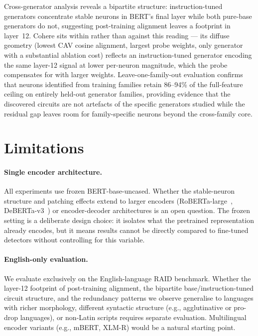 \documentclass[11pt]{article}
\newcommand{\bertbase}{BERT-base-uncased\xspace}
\begin{document}
Cross-generator analysis reveals a bipartite structure: instruction-tuned generators concentrate stable neurons in BERT's final layer while both pure-base generators do not, suggesting post-training alignment leaves a footprint in layer~12. Cohere sits within rather than against this reading --- its diffuse geometry (lowest CAV cosine alignment, largest probe weights, only generator with a substantial ablation cost) reflects an instruction-tuned generator encoding the same layer-12 signal at lower per-neuron magnitude, which the probe compensates for with larger weights. Leave-one-family-out evaluation confirms that neurons identified from training families retain 86--94\% of the full-feature ceiling on entirely held-out generator families, providing evidence that the discovered circuits are not artefacts of the specific generators studied while the residual gap leaves room for family-specific neurons beyond the cross-family core.

\section{Limitations}
\label{sec:limitations}

\paragraph{Single encoder architecture.}
All experiments use frozen \bertbase. Whether the stable-neuron structure and patching effects extend to larger encoders (RoBERTa-large~\citep{liu2019roberta}, DeBERTa-v3~\citep{he2021debertav3}) or encoder-decoder architectures is an open question. The frozen setting is a deliberate design choice: it isolates what the pretrained representation already encodes, but it means results cannot be directly compared to fine-tuned detectors without controlling for this variable.

\paragraph{English-only evaluation.}
We evaluate exclusively on the English-language RAID benchmark. Whether the layer-12 footprint of post-training alignment, the bipartite base/instruction-tuned circuit structure, and the redundancy patterns we observe generalise to languages with richer morphology, different syntactic structure (e.g., agglutinative or pro-drop languages), or non-Latin scripts requires separate evaluation. Multilingual encoder variants (e.g., mBERT, XLM-R) would be a natural starting point.
\end{document}

